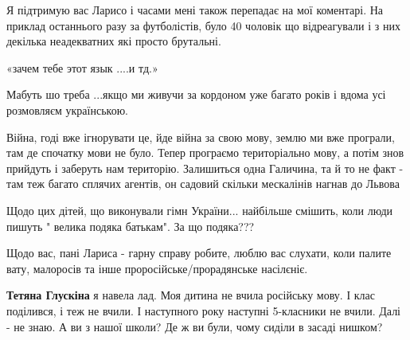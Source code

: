 \begin{itemize}
Я підтримую вас Ларисо і часами мені також перепадає на мої коментарі. На
приклад останнього разу за футболістів, було 40 чоловік що відреагували і з них
декілька неадекватних які просто брутальні.

«зачем тебе этот язык ....и тд.»

Мабуть шо треба ...якщо ми живучи за кордоном уже багато років і вдома усі
розмовляєм українською.


 

Війна, годі вже ігнорувати це, йде війна за свою мову, землю ми вже програли,
там де спочатку мови не було. Тепер програємо територіально мову, а потім знов
прийдуть і заберуть нам територію. Залишиться одна Галичина, та й то не факт -
там теж багато сплячих агентів, он садовий скільки мескалінів нагнав до Львова

 

Щодо цих дітей, що виконували гімн України... найбільше смішить, коли люди
пишуть " велика подяка батькам". За що подяка???

Щодо вас, пані Лариса - гарну справу робите, люблю вас слухати, коли палите
вату, малоросів та інше проросійське/прорадянське насілєніє.

\begin{itemize}

 
\textbf{Тетяна Глускіна} я навела лад. Моя дитина не вчила російську мову. І
клас поділився, і теж не вчили. І наступного року наступні 5-класники не вчили.
Далі - не знаю. А ви з нашої школи? Де ж ви були, чому сиділи в засаді нишком?

 

\end{itemize}
\end{itemize}
